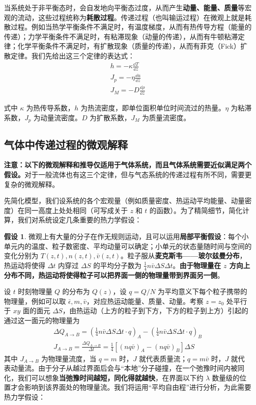 

当系统处于非平衡态时，会自发地向平衡态过度，从而产生\textbf{动量、能量、质量}等宏观的流动，这些过程统称为\textbf{耗散过程}。传递过程（也叫输运过程）在微观上就是耗散过程。例如当热学平衡条件不满足时，有温度梯度，从而有热传导方程（能量的传递）；力学平衡条件不满足时，有粘滞现象（动量的传递），从而有牛顿粘滞定律；化学平衡条件不满足时，有扩散现象（质量的传递），从而有菲克（Fick）扩散定律。我们先给出这三个定律的表达式：
\begin{align}
h=-\kappa \frac{\dd T}{\dd z}\\
J_p=-\eta \frac{\dd u}{\dd z}\\
J_M=-D\frac{\dd \rho}{\dd z}
\end{align}

式中 $\kappa$ 为热传导系数，$h$ 为热流密度，即单位面积单位时间流过的热量。$\eta$ 为粘滞系数，$J_p$ 为动量流密度。$D$ 为扩散系数，$J_M$ 为质量流密度。

\subsection{气体中传递过程的微观解释}
\textbf{注意：以下的微观解释和推导仅适用于\textbf{气体系统}，而且气体系统需要近似满足两个假设。}对于一般流体也有这三个定律，但与气态系统的传递过程有所不同，需要更复杂的微观解释。

先简化模型，我们设系统的各个宏观量（例如质量密度、热运动平均能量、动量密度）在同一高度上处处相同（可写成关于 $z$ 和 $t$ 的函数）。为了精简细节，简化计算，我们对系统设定几条重要的热力学假设：

\textbf{假设 1}. 微观上有大量的分子在作无规则运动，且可以运用\textbf{局部平衡假设}：每个小单元内的温度、粒子数密度、平均动量可以确定；小单元的状态量随时间与空间的变化分别为 $T(z,t),n(z,t),\bar v(z,t)$。粒子服从\textbf{麦克斯韦——玻尔兹曼分布}，热运动将使得 $\Delta t$ 内穿过 $\Delta S$ 的平均分子数为 $\frac{1}{4}n\bar v \Delta S\Delta t$。\textbf{由于物理量在 $z$ 方向上分布不同，热运动将使得粒子可以把界面一侧的物理量带到界面另一侧}。

设 $t$ 时刻物理量 $Q$ 的分布为 $Q(z)$，设 $q=Q/N$ 为平均意义下每个粒子携带的物理量，例如可以取 $\bar \epsilon,m,\bar v$，对应热运动能量、质量、动量。考察 $z=z_0$ 处平行于 $xy$ 面的面元 $\Delta S$，由热运动（上方的粒子到下方，下方的粒子到上方）引起的通过这一面元的物理量为
\begin{align}
\Delta Q_{A\rightarrow B}=(\frac{1}{4}n\bar v \Delta S\Delta t\cdot q)_A-(\frac{1}{4}n\bar v \Delta S\Delta t\cdot q)_B
\\
J_{A\rightarrow B}=\frac{\Delta Q_{A\rightarrow B}}{\Delta t}=\frac{1}{4}[(nq\bar v)_A-(nq\bar v)_B]\Delta S
\end{align}
其中 $J_{A\rightarrow B}$ 为物理量流度，当 $q=m$ 时，$J$ 就代表质量流；$q=m\bar v$ 时，$J$ 就代表动量流。由于分子从越过界面后会与“本地”分子碰撞，在一个弛豫时间内被同化，我们可以想象\textbf{当弛豫时间越短，同化得就越快}，在界面以下约 $\lambda$ 数量级的位置才会影响到该界面处的物理量流。我们将运用“平均自由程”进行分析，为此需要热力学假设：

